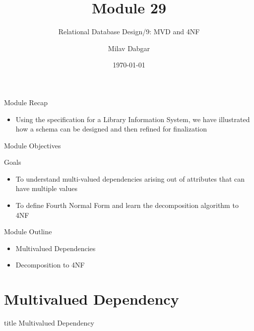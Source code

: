 \documentclass[aspectratio=169, xcolor=dvipsnames]{beamer}
\title{Module 29}
\subtitle{Relational Database Design/9: MVD and 4NF}
\author{Milav Dabgar}
\institute{www.milav.in}
\date{\today}
\begin{document}
\begin{frame}
    \titlepage
\end{frame}

\begin{frame}{Module Recap}
    \begin{itemize}[<+->]
        \item Using the specification for a Library Information System, we have illustrated how a schema can be designed and then refined for finalization
    \end{itemize}
\end{frame}

\begin{frame}{Module Objectives}
    \begin{block}{Goals}
        \begin{itemize}[<+->]
            \item To understand multi-valued dependencies arising out of attributes that can have multiple values
            \item To define Fourth Normal Form and learn the decomposition algorithm to 4NF
        \end{itemize}
    \end{block}
\end{frame}

\begin{frame}{Module Outline}
    \begin{itemize}[<+->]
        \item Multivalued Dependencies
        \item Decomposition to 4NF
    \end{itemize}
\end{frame}

\section{Multivalued Dependency}
\begin{frame}
  \vfill
  \centering
  \begin{beamercolorbox}[sep=8pt,center,shadow=true,rounded=true]{title}
    Multivalued Dependency\par%
  \end{beamercolorbox}
  \vfill
\end{frame}
\end{document}
